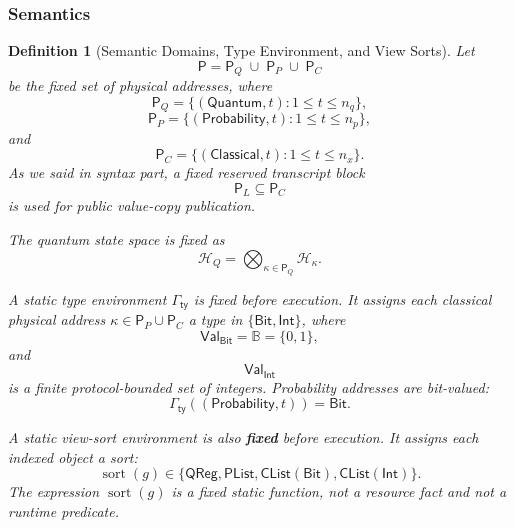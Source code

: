 \documentclass[acmsmall,screen,review,anonymous,nonacm]{acmart}
\newtheorem{definition}{Definition}[section]
\theoremstyle{defn_style}
\begin{document}

\subsubsection{Semantics}

\begin{definition}[Semantic Domains, Type Environment, and View Sorts]
Let
\[
\mathsf P
=
\mathsf P_Q
\;\cup\;
\mathsf P_P
\;\cup\;
\mathsf P_C
\]
be the fixed set of physical addresses, where
\[
\mathsf P_Q=\{(\mathsf{Quantum},t):1\le t\le n_q\},
\]
\[
\mathsf P_P=\{(\mathsf{Probability},t):1\le t\le n_p\},
\]
and
\[
\mathsf P_C=\{(\mathsf{Classical},t):1\le t\le n_x\}.
\]
As we said in syntax part, a fixed reserved transcript block
\[
\mathsf P_L\subseteq \mathsf P_C
\]
is used for public value-copy publication.

The quantum state space is fixed as
\[
\mathcal H_Q=\bigotimes_{\kappa\in\mathsf P_Q}\mathcal H_\kappa .
\]

A static type environment \(\Gamma_{\mathsf{ty}}\) is fixed before execution.
It assigns each classical physical address
\(\kappa\in \mathsf P_P\cup \mathsf P_C\)
a type in \(\{\mathsf{Bit},\mathsf{Int}\}\), where
\[
\mathsf{Val}_{\mathsf{Bit}}=\mathbb B=\{0,1\},
\]
and
\[
\mathsf{Val}_{\mathsf{Int}}
\]
is a finite protocol-bounded set of integers. Probability addresses are
bit-valued:
\[
\Gamma_{\mathsf{ty}}((\mathsf{Probability},t))=\mathsf{Bit}.
\]

A static view-sort environment is also \textbf{fixed} before execution. It assigns each
indexed object a sort:
\[
\operatorname{sort}(g)\in
\{
\mathsf{QReg},
\mathsf{PList},
\mathsf{CList}(\mathsf{Bit}),
\mathsf{CList}(\mathsf{Int})
\}.
\]
The expression \(\operatorname{sort}(g)\) is a fixed static function, not a
resource fact and not a runtime predicate.
\end{definition}
\end{document}
